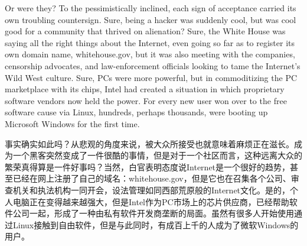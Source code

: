 \ifdefined\eng
Or were they? To the pessimistically inclined, each sign of acceptance carried its own troubling countersign. Sure, being a hacker was suddenly cool, but was cool good for a community that thrived on alienation? Sure, the White House was saying all the right things about the Internet, even going so far as to register its own domain name, whitehouse.gov, but it was also meeting with the companies, censorship advocates, and law-enforcement officials looking to tame the Internet's Wild West culture. Sure, PCs were more powerful, but in commoditizing the PC marketplace with its chips, Intel had created a situation in which proprietary software vendors now held the power. For every new user won over to the free software cause via Linux, hundreds, perhaps thousands, were booting up Microsoft Windows for the first time.
\fi

\ifdefined\chs
事实确实如此吗？从悲观的角度来说，被大众所接受也就意味着麻烦正在滋长。成为一个黑客突然变成了一件很酷的事情，但是对于一个社区而言，这种远离大众的繁荣真得算是一件好事吗？当然，白官表明态度说Internet是一个很好的趋势，甚至已经在网上注册了自己的域名：whitehouse.gov，但是它也在召集各个公司、审查机关和执法机构一同开会，设法管理如同西部荒原般的Internet文化。是的，个人电脑正在变得越来越强大，但是Intel作为PC市场上的芯片供应商，已经帮助软件公司一起，形成了一种由私有软件开发商垄断的局面。虽然有很多人开始使用通过Linux接触到自由软件，但是与此同时，有成百上千的人成为了微软Windows的用户。
\fi



